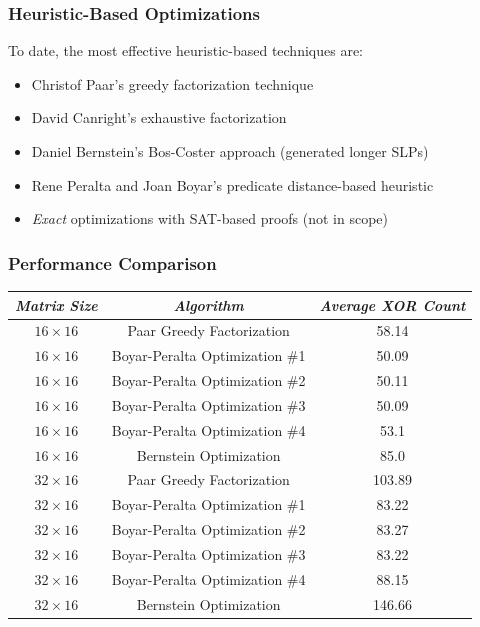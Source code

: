 \documentclass[10pt]{beamer}
\newcommand{\cmark}{\ding{51}}%
\newcommand{\xmark}{\ding{55}}%
\begin{document}
\begin{frame}
	\frametitle{Heuristic-Based Optimizations}
	To date, the most effective heuristic-based techniques are:
	\begin{itemize}
		\item Christof Paar's greedy factorization technique \pause \cmark
		\item David Canright's exhaustive factorization \pause \cmark
		\item Daniel Bernstein's Bos-Coster approach \pause \xmark (generated longer SLPs)
		\item Rene Peralta and Joan Boyar's predicate distance-based heuristic \pause \cmark
		\item \emph{Exact} optimizations with SAT-based proofs \pause \xmark (not in scope)
	\end{itemize}
\end{frame}


\begin{frame}
	\frametitle{Performance Comparison}
\begin{table}[h]
\begin{center}
	\begin{tabular}{| c | c | c |} \hline
		\emph{Matrix Size} & \emph{Algorithm} & \emph{Average XOR Count} \\ \hline
		$16 \times 16$ & Paar Greedy Factorization & 58.14 \\
		$16 \times 16$ & Boyar-Peralta Optimization \#1 & 50.09 \\
		$16 \times 16$ & Boyar-Peralta Optimization \#2 & 50.11 \\
		$16 \times 16$ & Boyar-Peralta Optimization \#3 & 50.09 \\
		$16 \times 16$ & Boyar-Peralta Optimization \#4 & 53.1 \\
		$16 \times 16$ & Bernstein Optimization & 85.0 \\ \hline
		$32 \times 16$ & Paar Greedy Factorization & 103.89 \\
		$32 \times 16$ & Boyar-Peralta Optimization \#1 & 83.22 \\
		$32 \times 16$ & Boyar-Peralta Optimization \#2 & 83.27 \\
		$32 \times 16$ & Boyar-Peralta Optimization \#3 & 83.22 \\
		$32 \times 16$ & Boyar-Peralta Optimization \#4 & 88.15 \\
		$32 \times 16$ & Bernstein Optimization & 146.66 \\ \hline
	\end{tabular}
\end{center}
\end{table}
\end{frame}
\end{document}
